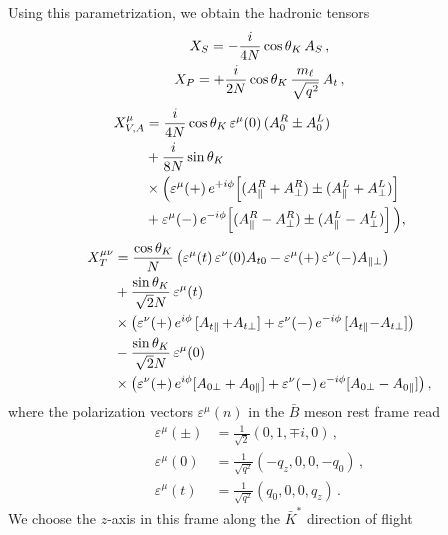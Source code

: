 Using this parametrization, we obtain the hadronic tensors
\begin{gather}
    X_S = -\frac{i}{4 N} \cos{\theta_{K}}\, A_S\,,\\
    X_P = +\frac{i}{2 N} \cos{\theta_{K}}\, \frac{m_\ell}{\sqrt{q^2}}\, A_{t}\,,
\end{gather}
\begin{align}
\label{eq:XVA}
  X^{\mu}_{V,A} & = \frac{i}{4 N} \cos{\theta_{K}}\, \varepsilon^\mu(0) \, (A_{0}^R \pm A_{0}^L)
\\
\nonumber
  & + \frac{i}{8 N} \sin{\theta_{K}}\\
\nonumber
  & \times \Big(\varepsilon^\mu(+)\, e^{+i \phi}\!\left\lbrack(A_\parallel^R + A_\perp^R) \pm (A_\parallel^L + A_\perp^L) \right\rbrack\\
\nonumber
  & +
  \varepsilon^\mu(-)\, e^{-i \phi}\!\left\lbrack(A_\parallel^R - A_\perp^R) \pm (A_\parallel^L - A_\perp^L) \right\rbrack\Big),
\end{align}
\begin{align}
    \raisetag{4.4ex}
  X^{\mu\nu}_{T} & = \frac{\cos\thK}{N}
  \left(\varepsilon^\mu(t)\,\varepsilon^\nu(0) A_{t0} - \varepsilon^\mu(+)\,\varepsilon^\nu(-)A_{\parallel\perp}\right)
\\
\nonumber
  & + \frac{\sin\thK}{\sqrt{2} N}\, \varepsilon^\mu(t)\\
\nonumber
  & \times \left(\varepsilon^\nu(+)\, e^{ i\phi}\, [A_{t\parallel}\, {+ A_{t\perp}}] + 
    \varepsilon^\nu(-)\, e^{-i\phi}\, [A_{t\parallel} {- A_{t\perp}}]\right)\\
\nonumber
  & - \frac{\sin\thK}{\sqrt{2} N}\, \varepsilon^\mu(0)\\
\nonumber
  & \times \left(\varepsilon^\nu(+)\, e^{i\phi} [A_{0\perp} + A_{0\parallel}] + 
    \varepsilon^\nu(-)\, e^{-i\phi}[A_{0\perp} - A_{0\parallel}]\right),
\end{align}
where the polarization vectors $\varepsilon^\mu(n)$ in the $\bar{B}$ meson rest
frame read \cite{Altmannshofer:2008dz}
\begin{equation}
\label{eq:pol-vectors:eps}
\begin{aligned}
  \varepsilon^\mu(\pm) & = \frac{1}{\sqrt{2}}(0,1,\mp i,0)\,,\\
  \varepsilon^\mu(0)   & = \frac{1}{\sqrt{q^2}}(-q_z, 0, 0, -q_0)\,,\\
  \varepsilon^\mu(t)   & = \frac{1}{\sqrt{q^2}}(q_0, 0, 0, q_z) \, .
\end{aligned}
\end{equation}
We choose the $z$-axis in this frame along the $\bar{K}^*$ direction of flight
